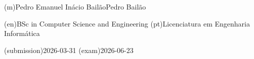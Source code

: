 %
%
\ntauthorname(m){Pedro Emanuel Inácio Bailão}{Pedro Bailão}



%
%
%
\ntauthordegree(en){BSc in Computer Science and Engineering}
\ntauthordegree(pt){Licenciatura em Engenharia Informática}




%
%
%

%
%
\ntdate(submission){2026-03-31}
\ntdate(exam){2026-06-23}




